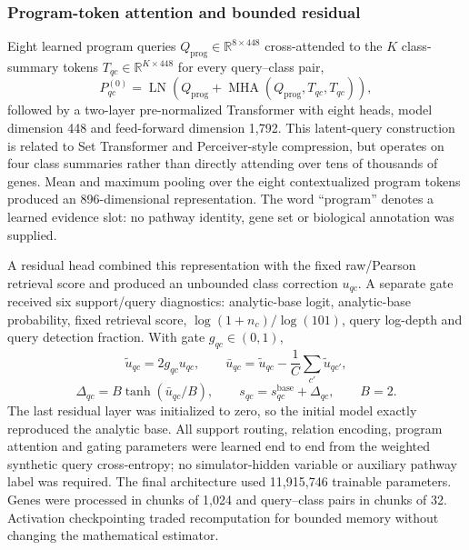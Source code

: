 \documentclass[12pt]{article}
\begin{document}
\subsubsection*{Program-token attention and bounded residual}

Eight learned program queries $Q_{\mathrm{prog}}\in\mathbb{R}^{8\times448}$ cross-attended to the $K$ class-summary tokens $T_{qc}\in\mathbb{R}^{K\times448}$ for every query--class pair,
\begin{equation}
 P^{(0)}_{qc}=\operatorname{LN}\!\left(Q_{\mathrm{prog}}+\operatorname{MHA}(Q_{\mathrm{prog}},T_{qc},T_{qc})\right),
\end{equation}
followed by a two-layer pre-normalized Transformer with eight heads, model dimension 448 and feed-forward dimension 1,792\cite{vaswani2017attention}. This latent-query construction is related to Set Transformer and Perceiver-style compression, but operates on four class summaries rather than directly attending over tens of thousands of genes\cite{lee2019settransformer,jaegle2021perceiver}. Mean and maximum pooling over the eight contextualized program tokens produced an 896-dimensional representation. The word ``program'' denotes a learned evidence slot: no pathway identity, gene set or biological annotation was supplied.

A residual head combined this representation with the fixed raw/Pearson retrieval score and produced an unbounded class correction $u_{qc}$. A separate gate received six support/query diagnostics: analytic-base logit, analytic-base probability, fixed retrieval score, $\log(1+n_c)/\log(101)$, query log-depth and query detection fraction. With gate $g_{qc}\in(0,1)$,
\begin{equation}
\tilde u_{qc}=2g_{qc}u_{qc},\qquad
\bar u_{qc}=\tilde u_{qc}-\frac{1}{C}\sum_{c'}\tilde u_{qc'},
\end{equation}
\begin{equation}
\Delta_{qc}=B\tanh(\bar u_{qc}/B),\qquad
s_{qc}=s^{\mathrm{base}}_{qc}+\Delta_{qc},\qquad B=2.
\end{equation}
The last residual layer was initialized to zero, so the initial model exactly reproduced the analytic base. All support routing, relation encoding, program attention and gating parameters were learned end to end from the weighted synthetic query cross-entropy; no simulator-hidden variable or auxiliary pathway label was required. The final architecture used 11,915,746 trainable parameters. Genes were processed in chunks of 1,024 and query--class pairs in chunks of 32. Activation checkpointing traded recomputation for bounded memory without changing the mathematical estimator\cite{chen2016checkpointing}.
\end{document}
